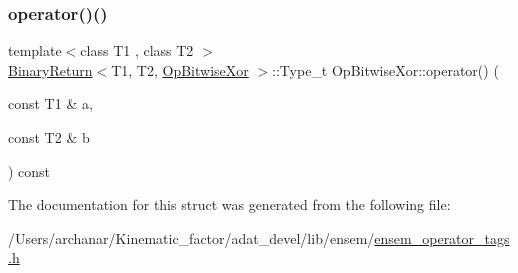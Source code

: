 \mbox{\label{structOpBitwiseXor_af0ce6a043ad61e902b5303b11a36ce4b}} 
\subsubsection{\texorpdfstring{operator()()}{operator()()}\hspace{0.1cm}{\footnotesize\ttfamily [2/2]}}
{\footnotesize\ttfamily template$<$class T1 , class T2 $>$ \\
\mbox{\hyperlink{structBinaryReturn}{Binary\+Return}}$<$T1, T2, \mbox{\hyperlink{structOpBitwiseXor}{Op\+Bitwise\+Xor}} $>$\+::Type\+\_\+t Op\+Bitwise\+Xor\+::operator() (\begin{DoxyParamCaption}\item[{const T1 \&}]{a,  }\item[{const T2 \&}]{b }\end{DoxyParamCaption}) const\hspace{0.3cm}{\ttfamily [inline]}}



The documentation for this struct was generated from the following file\+:\begin{DoxyCompactItemize}
\item 
/\+Users/archanar/\+Kinematic\+\_\+factor/adat\+\_\+devel/lib/ensem/\mbox{\hyperlink{lib_2ensem_2ensem__operator__tags_8h}{ensem\+\_\+operator\+\_\+tags.\+h}}\end{DoxyCompactItemize}
